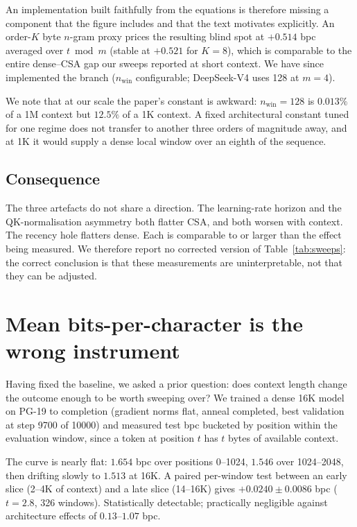 \documentclass[11pt]{article}
\begin{document}
An implementation built faithfully from the equations is therefore missing a
component that the figure includes and that the text motivates explicitly. An
order-$K$ byte $n$-gram proxy prices the resulting blind spot at
$+0.514$ bpc averaged over $t \bmod m$ (stable at $+0.521$ for $K=8$), which is
comparable to the entire dense--CSA gap our sweeps reported at short context.
We have since implemented the branch ($n_{\text{win}}$ configurable; DeepSeek-V4
uses 128 at $m=4$).

We note that at our scale the paper's constant is awkward: $n_{\text{win}}=128$
is $0.013\%$ of a 1M context but $12.5\%$ of a 1K context. A fixed architectural
constant tuned for one regime does not transfer to another three orders of
magnitude away, and at 1K it would supply a dense local window over an eighth of
the sequence.

\subsection{Consequence}

The three artefacts do not share a direction. The learning-rate horizon and the
QK-normalisation asymmetry both flatter CSA, and both worsen with context. The
recency hole flatters dense. Each is comparable to or larger than the effect
being measured. We therefore report no corrected version of
Table~\ref{tab:sweeps}: the correct conclusion is that these measurements are
uninterpretable, not that they can be adjusted.

\section{Mean bits-per-character is the wrong instrument}
\label{sec:dilution}

Having fixed the baseline, we asked a prior question: does context length
change the outcome enough to be worth sweeping over? We trained a dense 16K
model on PG-19 to completion (gradient norms flat, anneal completed, best
validation at step 9700 of 10000) and measured test bpc bucketed by position
within the evaluation window, since a token at position $t$ has $t$ bytes of
available context.

The curve is nearly flat: $1.654$ bpc over positions 0--1024, $1.546$ over
1024--2048, then drifting slowly to $1.513$ at 16K. A paired per-window test
between an early slice (2--4K of context) and a late slice (14--16K) gives
$+0.0240 \pm 0.0086$ bpc ($t=2.8$, 326 windows). Statistically detectable;
practically negligible against architecture effects of $0.13$--$1.07$ bpc.
\end{document}
